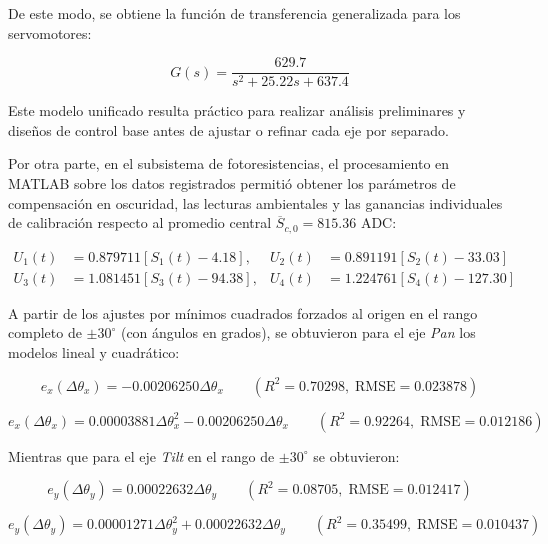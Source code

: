 \documentclass[12pt,a4paper]{article}
\begin{document}
De este modo, se obtiene la función de transferencia generalizada para los servomotores:

\begin{equation}
\boxed{
G(s) = \frac{629.7}{s^2 + 25.22s + 637.4}
}
\end{equation}

Este modelo unificado resulta práctico para realizar análisis preliminares y diseños de control base antes de ajustar o refinar cada eje por separado.

Por otra parte, en el subsistema de fotoresistencias, el procesamiento en MATLAB sobre los datos registrados permitió obtener los parámetros de compensación en oscuridad, las lecturas ambientales y las ganancias individuales de calibración respecto al promedio central $\overline{S}_{c,0} = 815.36$ ADC:

\begin{align}
U_1(t) &= 0.879711\left[S_1(t) - 4.18\right], &
U_2(t) &= 0.891191\left[S_2(t) - 33.03\right] \\
U_3(t) &= 1.081451\left[S_3(t) - 94.38\right], &
U_4(t) &= 1.224761\left[S_4(t) - 127.30\right]
\end{align}

A partir de los ajustes por mínimos cuadrados forzados al origen en el rango completo de $\pm 30^\circ$ (con ángulos en grados), se obtuvieron para el eje \emph{Pan} los modelos lineal y cuadrático:

\begin{equation}
e_x(\Delta\theta_x) = -0.00206250\Delta\theta_x \qquad (R^2 = 0.70298,\; \text{RMSE} = 0.023878)
\end{equation}

\begin{equation}
e_x(\Delta\theta_x) = 0.00003881\Delta\theta_x^2 - 0.00206250\Delta\theta_x \qquad (R^2 = 0.92264,\; \text{RMSE} = 0.012186)
\end{equation}

Mientras que para el eje \emph{Tilt} en el rango de $\pm 30^\circ$ se obtuvieron:

\begin{equation}
e_y(\Delta\theta_y) = 0.00022632\Delta\theta_y \qquad (R^2 = 0.08705,\; \text{RMSE} = 0.012417)
\end{equation}

\begin{equation}
e_y(\Delta\theta_y) = 0.00001271\Delta\theta_y^2 + 0.00022632\Delta\theta_y \qquad (R^2 = 0.35499,\; \text{RMSE} = 0.010437)
\end{equation}
\end{document}
